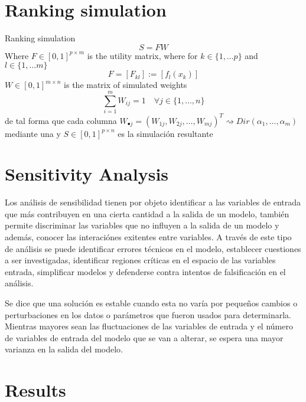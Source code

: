 \section{Ranking simulation}
Ranking simulation
\[ S = F W \]
Where $F\in[0,1]^{p\times m}$ is the utility matrix, where for $k\in\{1,\ldots p\}$ and
$l\in\{1,\ldots m\}$
\[ F = [F_{kl}] := [f_l(x_k)] \]
$W\in[0,1]^{m\times n}$ is the matrix of simulated weights
\[ \sum_{i=1}^m W_{ij} = 1 \quad \forall j\in\{1,\ldots,n\}\]
de tal forma que cada columna $W_{\bullet j} = (W_{1j},W_{2j},\ldots,W_{mj})^T\rightsquigarrow
Dir(\alpha_1,\ldots,\alpha_m)$ mediante una
y $S\in[0,1]^{p\times n}$ es la simulación resultante


\section{Sensitivity Analysis}
Los análisis de sensibilidad tienen por objeto identificar a las variables de entrada que más contribuyen en una cierta cantidad a la salida de un modelo, también permite discriminar las variables que no influyen a la salida de un modelo y además, conocer las interaciónes exitentes entre variables\citep{4}. A través de este tipo de análisis se puede identificar errores técnicos en el modelo, establecer cuestiones a ser investigadas, identificar regiones críticas en el espacio de las variables entrada, simplificar modelos y defenderse contra intentos de falsificación en el análisis\citep{5}. 

Se dice que una solución es estable cuando esta no varía por pequeños cambios o perturbaciones en los datos o parámetros que fueron usados para determinarla\citep{2}. Mientras mayores sean las fluctuaciones de las variables de entrada y el número de variables de entrada del modelo que se van a alterar, se espera una mayor varianza en la salida del modelo\citep{5}.    


\section{Results}

